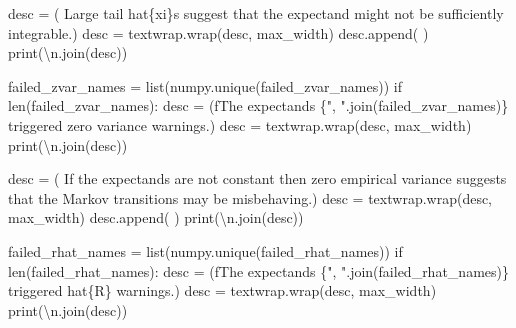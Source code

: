 \documentclass[
  letterpaper,
  DIV=11,
  numbers=noendperiod]{scrartcl}
\newenvironment{Shaded}{\begin{snugshade}}{\end{snugshade}}
\newcommand{\BuiltInTok}[1]{\textcolor[rgb]{0.00,0.23,0.31}{#1}}
\newcommand{\CharTok}[1]{\textcolor[rgb]{0.13,0.47,0.30}{#1}}
\newcommand{\ControlFlowTok}[1]{\textcolor[rgb]{0.00,0.23,0.31}{#1}}
\newcommand{\NormalTok}[1]{\textcolor[rgb]{0.00,0.23,0.31}{#1}}
\newcommand{\OperatorTok}[1]{\textcolor[rgb]{0.37,0.37,0.37}{#1}}
\newcommand{\SpecialCharTok}[1]{\textcolor[rgb]{0.37,0.37,0.37}{#1}}
\newcommand{\SpecialStringTok}[1]{\textcolor[rgb]{0.13,0.47,0.30}{#1}}
\newcommand{\StringTok}[1]{\textcolor[rgb]{0.13,0.47,0.30}{#1}}
\begin{document}
\begin{Shaded}
\begin{Highlighting}[]
\NormalTok{    desc }\OperatorTok{=}\NormalTok{ (}\StringTok{\textquotesingle{}  Large tail hat}\SpecialCharTok{\{xi\}}\StringTok{s suggest that the expectand \textquotesingle{}}
            \StringTok{\textquotesingle{}might not be sufficiently integrable.\textquotesingle{}}\NormalTok{)}
\NormalTok{    desc }\OperatorTok{=}\NormalTok{ textwrap.wrap(desc, max\_width)}
\NormalTok{    desc.append(}\StringTok{\textquotesingle{} \textquotesingle{}}\NormalTok{)}
    \BuiltInTok{print}\NormalTok{(}\StringTok{\textquotesingle{}}\CharTok{\textbackslash{}n}\StringTok{\textquotesingle{}}\NormalTok{.join(desc))}
  
\NormalTok{  failed\_zvar\_names }\OperatorTok{=} \BuiltInTok{list}\NormalTok{(numpy.unique(failed\_zvar\_names))}
  \ControlFlowTok{if} \BuiltInTok{len}\NormalTok{(failed\_zvar\_names):}
\NormalTok{    desc }\OperatorTok{=}\NormalTok{ (}\SpecialStringTok{f\textquotesingle{}The expectands }\SpecialCharTok{\{}\StringTok{", "}\SpecialCharTok{.}\NormalTok{join(failed\_zvar\_names)}\SpecialCharTok{\}}\SpecialStringTok{ \textquotesingle{}}
             \StringTok{\textquotesingle{}triggered zero variance warnings.\textquotesingle{}}\NormalTok{)}
\NormalTok{    desc }\OperatorTok{=}\NormalTok{ textwrap.wrap(desc, max\_width)}
    \BuiltInTok{print}\NormalTok{(}\StringTok{\textquotesingle{}}\CharTok{\textbackslash{}n}\StringTok{\textquotesingle{}}\NormalTok{.join(desc))}
    
\NormalTok{    desc }\OperatorTok{=}\NormalTok{ (}\StringTok{\textquotesingle{}  If the expectands are not constant then zero empirical\textquotesingle{}}
            \StringTok{\textquotesingle{} variance suggests that the Markov\textquotesingle{}}
            \StringTok{\textquotesingle{} transitions may be misbehaving.\textquotesingle{}}\NormalTok{)}
\NormalTok{    desc }\OperatorTok{=}\NormalTok{ textwrap.wrap(desc, max\_width)}
\NormalTok{    desc.append(}\StringTok{\textquotesingle{} \textquotesingle{}}\NormalTok{)}
    \BuiltInTok{print}\NormalTok{(}\StringTok{\textquotesingle{}}\CharTok{\textbackslash{}n}\StringTok{\textquotesingle{}}\NormalTok{.join(desc))}
      
\NormalTok{  failed\_rhat\_names }\OperatorTok{=} \BuiltInTok{list}\NormalTok{(numpy.unique(failed\_rhat\_names))}
  \ControlFlowTok{if} \BuiltInTok{len}\NormalTok{(failed\_rhat\_names):}
\NormalTok{    desc }\OperatorTok{=}\NormalTok{ (}\SpecialStringTok{f\textquotesingle{}The expectands }\SpecialCharTok{\{}\StringTok{", "}\SpecialCharTok{.}\NormalTok{join(failed\_rhat\_names)}\SpecialCharTok{\}}\SpecialStringTok{ \textquotesingle{}}
             \StringTok{\textquotesingle{}triggered hat}\SpecialCharTok{\{R\}}\StringTok{ warnings.\textquotesingle{}}\NormalTok{)}
\NormalTok{    desc }\OperatorTok{=}\NormalTok{ textwrap.wrap(desc, max\_width)}
    \BuiltInTok{print}\NormalTok{(}\StringTok{\textquotesingle{}}\CharTok{\textbackslash{}n}\StringTok{\textquotesingle{}}\NormalTok{.join(desc))}
    

\end{Highlighting}
\end{Shaded}
\end{document}

